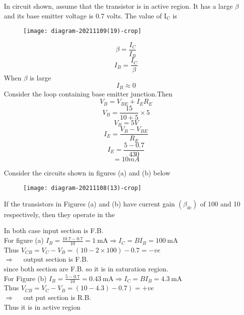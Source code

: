 \begin{enumerate}
		\begin{minipage}{\textwidth}
		\item In circuit shown, assume that the transistor is in active region. It has a large $\beta$ and its base emitter voltage is $0.7$ volts. The value of $\mathrm{I}_{\mathrm{C}}$ is
		\begin{figure}[H]
			\centering
			\texttt{[image: diagram-20211109(19)-crop]}
		\end{figure}
	\end{minipage}
	\begin{answer}
		$$\beta=\frac{I_C}{I_B}$$
		$$I_B=\frac{I_C}{\beta}$$
		When $\beta$ is large \\
		$$I_B\approx 0$$
		Consider the loop containing base emitter junction.Then 
		$$V_B=V_{BE}+I_ER_E$$
		$$V_B=\frac{15}{10+5}\times 5$$
		$$V_B=5V$$
		$$I_E=\frac{V_B-V_{BE}}{R_E}$$
		$$I_E=\frac{5-0.7}{430}$$
		$$=10mA$$
	\end{answer}
		\begin{minipage}{\textwidth}
		\item Consider the circuits shown in figures (a) and (b) below
		\begin{figure}[H]
			\centering
			\texttt{[image: diagram-20211108(13)-crop]}
		\end{figure}
		If the transistors in Figures (a) and (b) have current gain $\left(\beta_{d c}\right)$ of 100 and 10 respectively, then they operate in the\\
	\end{minipage}
	\begin{answer}
	In both case input section is F.B.\\
		For figure (a) $I_{B}=\frac{10.7-0.7}{10}=1 \mathrm{~mA} \Rightarrow I_{C}=B I_{B}=100 \mathrm{~mA}$\\
		Thus $V_{C B}=V_{C}-V_{B}=(10-2 \times 100)-0.7=-v e$\\
		$\Rightarrow \quad$ output section is F.B.\\
		since both section are F.B. so it is in saturation region.\\
		For Figure (b) $I_{B}=\frac{5-0.7}{10}=0.43 \mathrm{~mA} \Rightarrow I_{C}=B I_{B}=4.3 \mathrm{~mA}$\\
		Thus $\left.V_{C B}=V_{C}-V_{B}=(10-4.3)-0.7\right)=+v e$\\
		$\Rightarrow \quad$ out put section is R.B.\\
		Thus it is in active region
\end{answer}

\end{enumerate}
